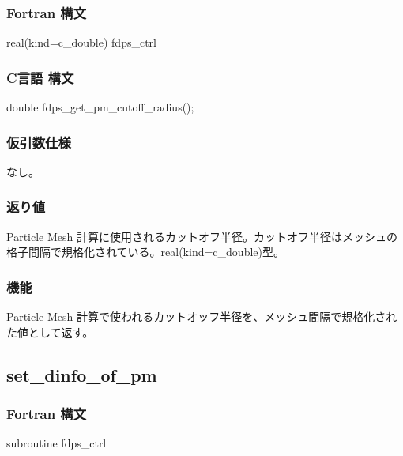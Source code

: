 \subsubsection*{Fortran 構文}
\begin{screen}
\begin{spverbatim}
real(kind=c_double) fdps_ctrl%
\end{spverbatim}
\end{screen}

\subsubsection*{C言語 構文}
\begin{screen}
\begin{spverbatim}
double fdps_get_pm_cutoff_radius();
\end{spverbatim}
\end{screen}

\subsubsection*{仮引数仕様}
なし。

\subsubsection*{返り値}
Particle Mesh 計算に使用されるカットオフ半径。カットオフ半径はメッシュの格子間隔で規格化されている。real(kind=c\_double)型。

\subsubsection*{機能}
Particle Mesh 計算で使われるカットオッフ半径を、メッシュ間隔で規格化された値として返す。
\clearpage

\subsection{set\_dinfo\_of\_pm}
\subsubsection*{Fortran 構文}
\begin{screen}
\begin{spverbatim}
subroutine fdps_ctrl%
\end{spverbatim}
\end{screen}

